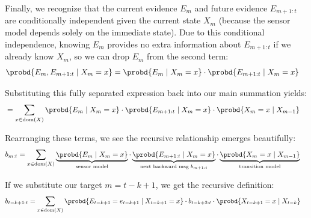 Finally, we recognize that the current evidence $E_m$ and future evidence $E_{m+1:t}$ are conditionally independent given the current state $X_m$ (because the sensor model depends solely on the immediate state). Due to this conditional independence, knowing $E_m$ provides no extra information about $E_{m+1:t}$ if we already know $X_m$, so we can drop $E_m$ from the second term:
\begin{align*}
\probd{E_m, E_{m+1:t} \mid X_m = x} &= \probd{E_m \mid X_m = x} \cdot \probd{E_{m+1:t} \mid X_m = x}
\end{align*}

Substituting this fully separated expression back into our main summation yields:
\begin{align*}
&= \sum_{x \in \text{dom}(X)} \probd{E_m \mid X_m = x} \cdot \probd{E_{m+1:t} \mid X_m = x} \cdot \probd{X_m = x \mid X_{m-1}}
\end{align*}

Rearranging these terms, we see the recursive relationship emerges beautifully:
\begin{align*}
b_{m:t} &= \sum_{x \in \text{dom}(X)} \underbrace{\probd{E_m \mid X_m = x}}_{\text{sensor model}} \cdot \underbrace{\probd{E_{m+1:t} \mid X_m = x}}_{\text{next backward msg } b_{m+1:t}} \cdot \underbrace{\probd{X_m = x \mid X_{m-1}}}_{\text{transition model}}
\end{align*}

If we substitute our target $m = t-k+1$, we get the recursive definition:
\begin{align*}
b_{t-k+1:t} &= \sum_{x \in \text{dom}(X)} \probd{E_{t-k+1} = e_{t-k+1} \mid X_{t-k+1}=x} \cdot b_{t-k+2:t} \cdot \probd{X_{t-k+1} = x \mid X_{t-k}}
\end{align*}




